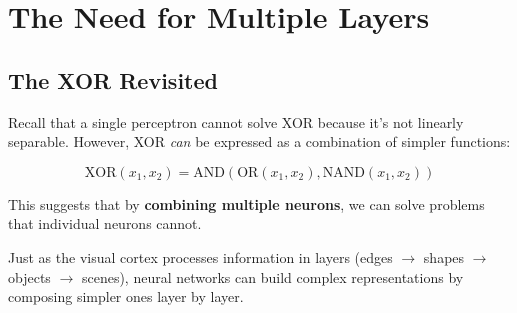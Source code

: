 
\section{The Need for Multiple Layers}

\subsection{The XOR Revisited}

Recall that a single perceptron cannot solve XOR because it's not linearly separable. However, XOR \textit{can} be expressed as a combination of simpler functions:

\[
\text{XOR}(x_1, x_2) = \text{AND}(\text{OR}(x_1, x_2), \text{NAND}(x_1, x_2))
\]

This suggests that by \textbf{combining multiple neurons}, we can solve problems that individual neurons cannot.

\begin{center}
\end{center}

\begin{bluebox}
Just as the visual cortex processes information in layers (edges $\rightarrow$ shapes $\rightarrow$ objects $\rightarrow$ scenes), neural networks can build complex representations by composing simpler ones layer by layer.
\end{bluebox}

